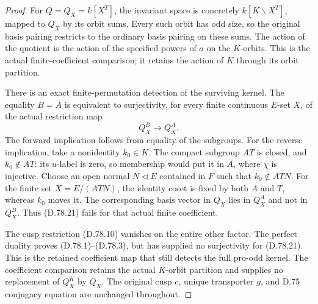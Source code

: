 \begin{proof}
For $Q=Q_X=k[X^T]$, the invariant space is concretely
$k[K\backslash X^T]$, mapped to $Q_X$ by its orbit sums. Every such orbit
has odd size, so the original basis pairing restricts to the ordinary
basis pairing on these sums. The action of the quotient is the action
of the specified powers of $a$ on the $K$-orbits. This is the actual
finite-coefficient comparison; it retains the action of $K$ through
its orbit partition.

There is an exact finite-permutation detection of the surviving kernel.
The equality $B=A$ is equivalent to surjectivity, for every finite
continuous $E$-set $X$, of the actual restriction map
\[
       Q_X^B\longrightarrow Q_X^A.                            \tag{D.78.21}
\]
The forward implication follows from equality of the subgroups.
For the reverse implication, take a nonidentity $k_0\in K$.
The compact subgroup $AT$ is closed, and $k_0\notin AT$:
its $u$-label is zero, so membership would put it in $A$, where $\chi$
is injective. Choose an open normal $N\triangleleft E$ contained in
$F$ such that $k_0\notin ATN$. For the finite set $X=E/(ATN)$,
the identity coset is fixed by both $A$ and $T$, whereas $k_0$ moves it.
The corresponding basis vector in $Q_X$ lies in $Q_X^A$ and not in
$Q_X^B$. Thus (D.78.21) fails for that actual finite coefficient.

The cusp restriction (D.78.10) vanishes on the entire other factor.
The perfect duality proves (D.78.1)--(D.78.3), but has supplied no
surjectivity for (D.78.21). This is the retained coefficient map that
still detects the full pro-odd kernel. The coefficient comparison retains the actual
$K$-orbit partition and supplies no replacement of $Q_X^K$ by $Q_X$. The original cusp $c$, unique transporter $g$, and
D.75 conjugacy equation are unchanged throughout.

\end{proof}
